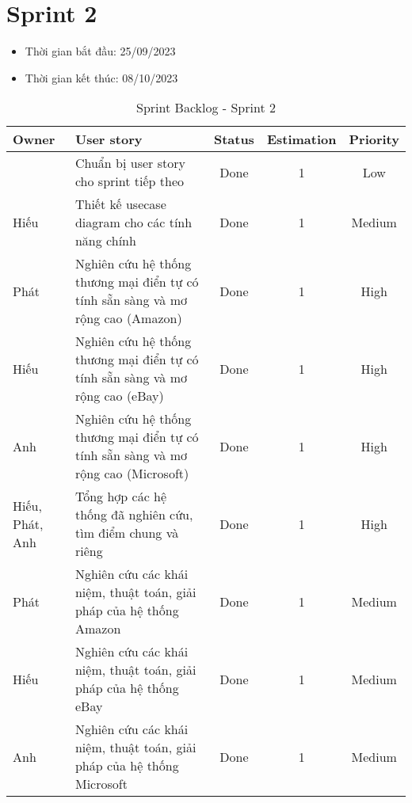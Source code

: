 \section{Sprint 2}
\begin{itemize}
    \item Thời gian bắt đầu: 25/09/2023
    \item Thời gian kết thúc: 08/10/2023
\end{itemize} 
\begin{table}[H]
    \begin{tabular}{|m{2.5cm}|m{6cm}|c|c|c|}
    \hline
    \textbf{Owner}  & \textbf{User story}                                & \textbf{Status} & \textbf{Estimation} & \textbf{Priority} \\ \hline
                   & Chuẩn bị user story cho sprint tiếp theo                              & Done            & 1                   & Low           \\ \hline
    Hiếu                 & Thiết kế usecase diagram cho các tính năng chính                         & Done            & 1                   & Medium            \\ \hline
    Phát                 & Nghiên cứu hệ thống thương mại điển tự có tính sẵn sàng và mơ rộng cao (Amazon)                             & Done            & 1                   & High           \\ \hline
    Hiếu                & Nghiên cứu hệ thống thương mại điển tự có tính sẵn sàng và mơ rộng cao (eBay)                       & Done            & 1                   & High           \\ \hline
    Anh                 & Nghiên cứu hệ thống thương mại điển tự có tính sẵn sàng và mơ rộng cao (Microsoft)                               & Done            & 1                   & High           \\ \hline
    Hiếu, Phát, Anh                 & Tổng hợp các hệ thống đã nghiên cứu, tìm điểm chung và riêng                          & Done            & 1                   & High           \\ \hline
    Phát                 & Nghiên cứu các khái niệm, thuật toán, giải pháp của hệ thống Amazon                        & Done            & 1                   & Medium           \\ \hline
    Hiếu                & Nghiên cứu các khái niệm, thuật toán, giải pháp của hệ thống eBay                        & Done            & 1                   & Medium           \\ \hline
    Anh                 & Nghiên cứu các khái niệm, thuật toán, giải pháp của hệ thống Microsoft                        & Done            & 1                   & Medium           \\ \hline
    \end{tabular}
    \caption{Sprint Backlog - Sprint 2}
    \label{tab:sprint-2}
\end{table}
